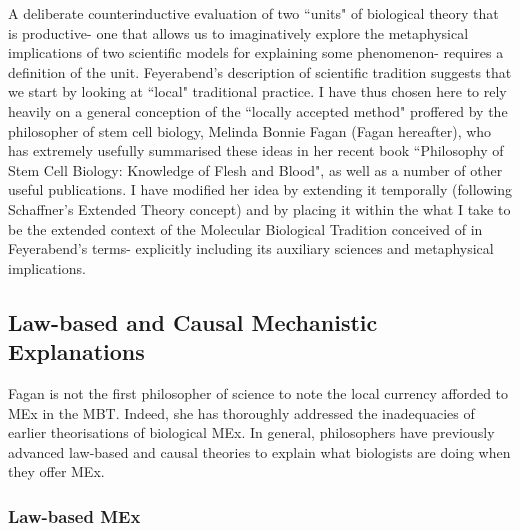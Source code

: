 A deliberate counterinductive evaluation of two ``units" of biological theory that is productive- one that allows us to imaginatively explore the metaphysical implications of two scientific models for explaining some phenomenon- requires a definition of the unit. Feyerabend's description of scientific tradition suggests that we start by looking at ``local" traditional practice. I have thus chosen here to rely heavily on a general conception of the ``locally accepted method" proffered by the philosopher of stem cell biology, Melinda Bonnie Fagan (Fagan hereafter), who has extremely usefully summarised these ideas in her recent book ``Philosophy of Stem Cell Biology: Knowledge of Flesh and Blood", as well as a number of other useful publications\cite{Fagan2013,Fagan2015,Fagan2015a}. I have modified her idea by extending it temporally (following Schaffner's Extended Theory concept\cite[p.211]{Schaffner1993}) and by placing it within the what I take to be the extended context of the Molecular Biological Tradition conceived of in Feyerabend's terms- explicitly including its auxiliary sciences and metaphysical implications.

\subsection{Law-based and Causal Mechanistic Explanations}

Fagan is not the first philosopher of science to note the local currency afforded to MEx in the MBT. Indeed, she has thoroughly addressed the inadequacies of earlier theorisations of biological MEx. In general, philosophers have previously advanced law-based and causal theories to explain what biologists are doing when they offer MEx.

\subsubsection{Law-based MEx}

